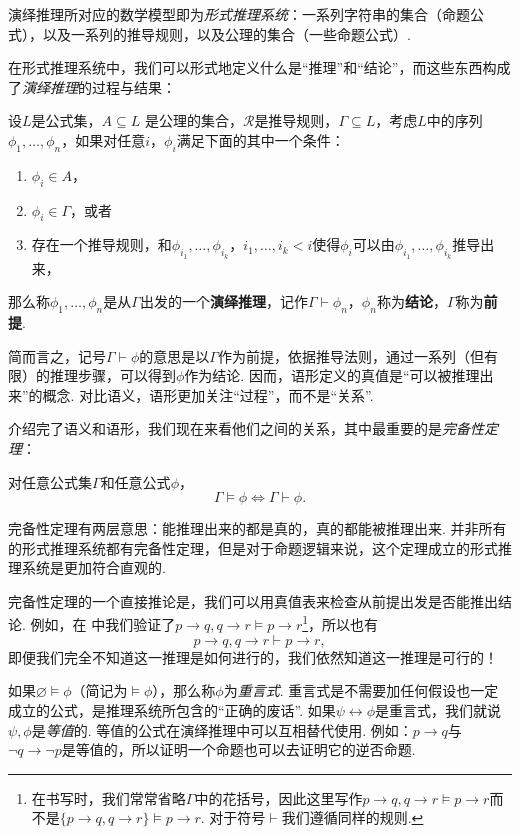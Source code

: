 演绎推理所对应的数学模型即为\textit{形式推理系统}：一系列字符串的集合（命题公式），以及一系列的推导规则，以及公理的集合（一些命题公式）. 

在形式推理系统中，我们可以形式地定义什么是“推理”和“结论”，而这些东西构成了\textit{演绎推理}的过程与结果：

\begin{definition}[演绎推理]
设$L$是公式集，$A\subseteq L$ 是公理的集合，$\mathcal R$是推导规则，$\Gamma\subseteq L$，考虑$L$中的序列$\phi_1,\dots,\phi_n$，如果对任意$i$，$\phi_i$满足下面的其中一个条件：
\begin{enumerate}
    \item $\phi_i\in A$，
    \item $\phi_i\in\Gamma$，或者
    \item 存在一个推导规则，和$\phi_{i_1},\dots,\phi_{i_k}$，$i_1,\dots,i_k<i$使得$\phi_i$可以由$\phi_{i_1},\dots,\phi_{i_k}$推导出来，
\end{enumerate}
那么称$\phi_1,\dots,\phi_n$是从$\Gamma$出发的一个\textbf{演绎推理}，记作$\Gamma\vdash\phi_n$，$\phi_n$称为\textbf{结论}，$\Gamma$称为\textbf{前提}.
\end{definition}


简而言之，记号$\Gamma\vdash\phi$的意思是以$\Gamma$作为前提，依据推导法则，通过一系列（但有限）的推理步骤，可以得到$\phi$作为结论. 因而，语形定义的真值是“可以被推理出来”的概念. 对比语义，语形更加关注“过程”，而不是“关系”.

介绍完了语义和语形，我们现在来看他们之间的关系，其中最重要的是\textit{完备性定理}：
\begin{theorem}[完备性定理]
对任意公式集$\Gamma$和任意公式$\phi$，
\[\Gamma\vDash\phi\iff\Gamma\vdash\phi.\]
\end{theorem}

完备性定理有两层意思：能推理出来的都是真的，真的都能被推理出来. 并非所有的形式推理系统都有完备性定理，但是对于命题逻辑来说，这个定理成立的形式推理系统是更加符合直观的. 

完备性定理的一个直接推论是，我们可以用真值表来检查从前提出发是否能推出结论. 例如，在 中我们验证了$p\to q,q\to r\vDash p\to r$\footnote{在书写时，我们常常省略$\Gamma$中的花括号，因此这里写作$p\to q,q\to r\vDash p\to r$而不是$\{p\to q,q\to r\}\vDash p\to r$. 对于符号$\vdash$我们遵循同样的规则.}，所以也有
\[p\to q,q\to r\vdash p\to r,\]
即便我们完全不知道这一推理是如何进行的，我们依然知道这一推理是可行的！

如果$\varnothing\vDash \phi$（简记为$\vDash\phi$），那么称$\phi$为\textit{重言式}. 重言式是不需要加任何假设也一定成立的公式，是推理系统所包含的“正确的废话”. 如果$\psi\leftrightarrow\phi$是重言式，我们就说$\psi,\phi$是\textit{等值}的. 等值的公式在演绎推理中可以互相替代使用. 例如：$p\to q$与$\neg q\to\neg p$是等值的，所以证明一个命题也可以去证明它的逆否命题.

